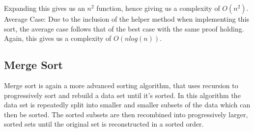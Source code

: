 \documentclass{article}
\begin{document}
Expanding this gives us an \begin{math}n^2\end{math} function, hence giving us a complexity of \begin{math}O(n^2)\end{math}.
\newline\newline
Average Case:
\newline
Due to the inclusion of the helper method when implementing this sort, the average case follows that of the best case with the same proof holding. Again, this gives us a complexity of \begin{math}O(nlog(n))\end{math}.









\subsection{Merge Sort}
Merge sort is again a more advanced sorting algorithm, that uses recursion to progressively sort and rebuild a data set until it's sorted. In this algorithm the data set is repeatedly split into smaller and smaller subsets of the data which can then be sorted. The sorted subsets are then recombined into progressively larger, sorted sets until the original set is reconstructed in a sorted order.
\end{document}
